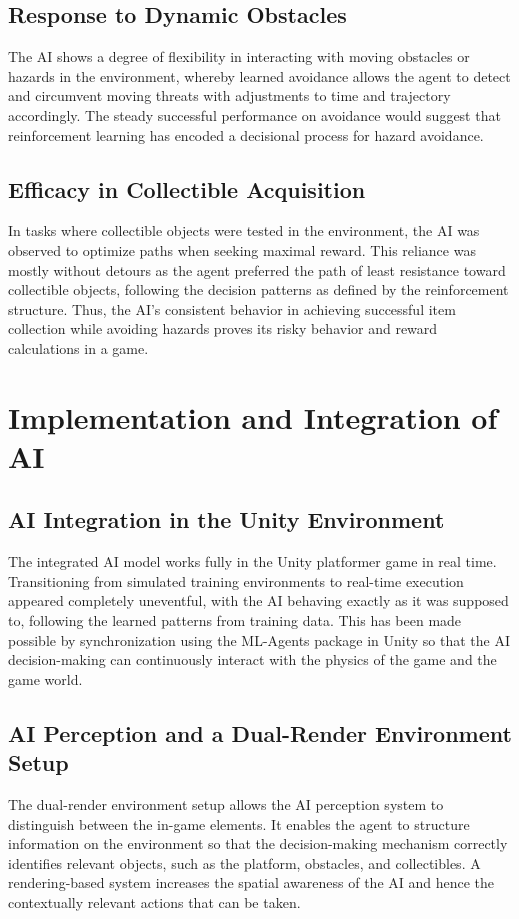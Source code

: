 \documentclass[12pt,oneside,openright,a4paper]{cpe-english-project}
\begin{document}
\subsection{Response to Dynamic Obstacles}
The AI shows a degree of flexibility in interacting with moving obstacles or hazards in the environment, whereby learned avoidance allows the agent to detect and circumvent moving threats with adjustments to time and trajectory accordingly. The steady successful performance on avoidance would suggest that reinforcement learning has encoded a decisional process for hazard avoidance. 
\subsection{Efficacy in Collectible Acquisition}
In tasks where collectible objects were tested in the environment, the AI was observed to optimize paths when seeking maximal reward. This reliance was mostly without detours as the agent preferred the path of least resistance toward collectible objects, following the decision patterns as defined by the reinforcement structure. Thus, the AI's consistent behavior in achieving successful item collection while avoiding hazards proves its risky behavior and reward calculations in a game.
\section{Implementation and Integration of AI}
\subsection{AI Integration in the Unity Environment}
The integrated AI model works fully in the Unity platformer game in real time. Transitioning from simulated training environments to real-time execution appeared completely uneventful, with the AI behaving exactly as it was supposed to, following the learned patterns from training data. This has been made possible by synchronization using the ML-Agents package in Unity so that the AI decision-making can continuously interact with the physics of the game and the game world.
\subsection{AI Perception and a Dual-Render Environment Setup}
The dual-render environment setup allows the AI perception system to distinguish between the in-game elements. It enables the agent to structure information on the environment so that the decision-making mechanism correctly identifies relevant objects, such as the platform, obstacles, and collectibles. A rendering-based system increases the spatial awareness of the AI and hence the contextually relevant actions that can be taken.
\end{document}
